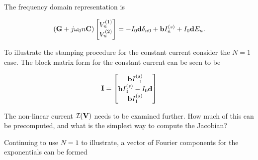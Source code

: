 \documentclass[12pt,journal,compsoc]{../ieeepaper/IEEEtran}
\begin{document}
%
%
%
%

The frequency domain representation is

\begin{equation}\label{eqn:ece1254projectReport:820}
\lr{ \BG + j \omega_0 n \BC } 
\begin{bmatrix}
V^{(1)}_n \\
V^{(2)}_n \\
\end{bmatrix}
=
-I_0 \Bd \delta_{n 0}
+
\Bb I^{(s)}_n
+ I_0 \Bd E_n.
\end{equation}

To illustrate the stamping procedure for the constant current consider the \( N = 1 \) case.  The block matrix form for the constant current can be seen to be

\begin{equation}\label{eqn:ece1254projectReport:840}
\BI
=
\begin{bmatrix}
\Bb I^{(s)}_{-1} \\
\Bb I^{(s)}_{0} - I_0 \Bd \\
\Bb I^{(s)}_{1} \\
\end{bmatrix}
\end{equation}

The non-linear current \( \mathcal{I}(\mathbf{V}) \) needs to be examined further.  How much of this can be precomputed, and what is the simplest way to compute the Jacobian?

Continuing to use \( N = 1 \) to illustrate, a vector of Fourier components for the exponentials can be formed
\end{document}
